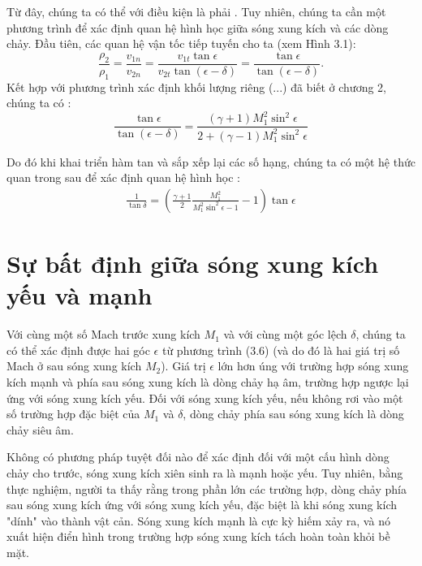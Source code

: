 \documentclass[DONG_CHAY_NEN_DUOC.tex]{subfiles}
\begin{document}
Từ đây, chúng ta có thể  với điều kiện là phải . Tuy nhiên, chúng ta cần một phương trình để xác định quan hệ hình học giữa sóng xung kích và các dòng chảy. Đầu tiên, các quan hệ vận tốc tiếp tuyến cho ta (xem Hình 3.1):
$$
\frac{{{\rho _2}}}{{{\rho _1}}} = \frac{{{v_{1n}}}}{{{v_{2n}}}} = \frac{{{v_{1t}}\tan \epsilon }}{{{v_{2t}}\tan \left( {\epsilon  - \delta } \right)}} = \frac{{\tan \epsilon }}{{\tan \left( {\epsilon  - \delta } \right)}}.
$$
Kết hợp với phương trình xác định khối lượng riêng (...) đã biết ở chương 2, chúng ta có :
$$
\frac{{\tan \epsilon }}{{\tan \left( {\epsilon  - \delta } \right)}} = \frac{{\left( {\gamma  + 1} \right)M_1^2{{\sin }^2}\epsilon }}{{2 + \left( {\gamma  - 1} \right)M_1^2{{\sin }^2}\epsilon }}
$$

Do đó khi khai triển hàm tan và sắp xếp lại các số hạng, chúng ta có một hệ thức quan trong sau để xác định quan hệ hình học :
\begin{equation}
	\begin{aligned}
		\boxed{
			\frac{1}{{\tan \delta }} = \left( {\frac{{\gamma  + 1}}{2}\frac{{M_1^2}}{{M_1^2{{\sin }^2}\epsilon  - 1}} - 1} \right)\tan \epsilon 
		}
	\end{aligned}
\end{equation}
\section{Sự bất định giữa sóng xung kích yếu và mạnh}
Với cùng một số Mach trước xung kích $M_1$ và với cùng một góc lệch $\delta$, chúng ta có thể xác định được hai góc $\epsilon$ từ phương trình (3.6) (và do đó là hai giá trị số Mach ở sau sóng xung kích $M_2$). Giá trị $\epsilon$ lớn hơn úng với trường hợp sóng xung kích mạnh và phía sau sóng xung kích là dòng chảy hạ âm, trường hợp ngược lại ứng với sóng xung kích yếu. Đối với sóng xung kích yếu, nếu không rơi vào một số trường hợp đặc biệt của $M_1$ và $\delta$, dòng chảy phía sau sóng xung kích là dòng chảy siêu âm.

Không có phương pháp tuyệt đối nào để xác định đối với một cấu hình dòng chảy cho trước, sóng xung kích xiên sinh ra là mạnh hoặc yếu. Tuy nhiên, bằng thực nghiệm, người ta thấy rằng trong phần lớn các trường hợp, dòng chảy phía sau sóng xung kích ứng với sóng xung kích yếu, đặc biệt là khi sóng xung kích "dính" vào thành vật cản. Sóng xung kích mạnh là cực kỳ hiếm xảy ra, và nó xuất hiện điển hình trong trường hợp sóng xung kích tách hoàn toàn khỏi bề mặt.
\end{document}

